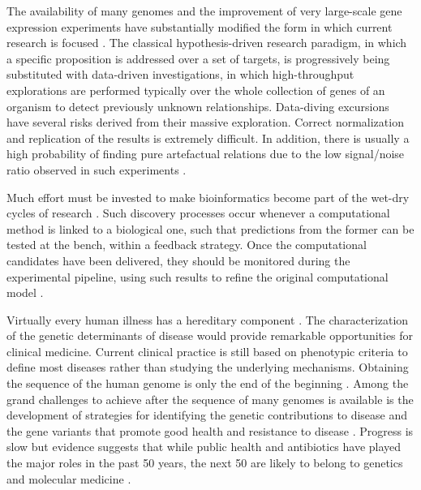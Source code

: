 \label{sec:pgera}


The availability of many genomes and the improvement of very large-scale gene expression experiments
have substantially modified the form in which current research is focused \citep{searls:2005a}. 
The classical hypothesis-driven research paradigm, in which a specific proposition is addressed over 
a set of targets, is progressively being substituted with data-driven investigations, in which high-throughput 
explorations are performed typically over the whole collection of genes of an organism to detect
previously unknown relationships. Data-diving excursions have several risks derived from their 
massive exploration. Correct normalization and replication of the results is extremely difficult.
In addition, there is usually a high probability of finding pure artefactual relations due to the 
low signal/noise ratio observed in such experiments \citep{searls:2005a}.

Much effort must be invested to make bioinformatics become part of the wet-dry cycles of research
\citep{searls:2000a}. Such discovery processes occur whenever a computational method is linked to a 
biological one, such that predictions from the former can be tested at the bench, within a feedback 
strategy. Once the computational candidates have been delivered, they should be monitored during the 
experimental pipeline, using such results to refine the original computational model \citep{searls:2000a}.


Virtually every human illness has a hereditary component \citep{collins:2001a}. The characterization 
of the genetic determinants of disease would provide remarkable opportunities for clinical medicine. 
Current clinical practice is still based on phenotypic criteria to define most diseases rather than
studying the underlying mechanisms. Obtaining the sequence of the human genome is only the end of the 
beginning \citep{collins:2001a}. Among the grand challenges to achieve after the sequence of many
genomes is available is the development of strategies for identifying the genetic contributions to 
disease and the gene variants that promote good health and resistance to disease \citep{collins:2003a}. 
Progress is slow but evidence suggests that while public health and antibiotics have played the major 
roles in the past 50 years, the next 50 are likely to belong to genetics and molecular medicine 
\citep{bell:2003a}.

